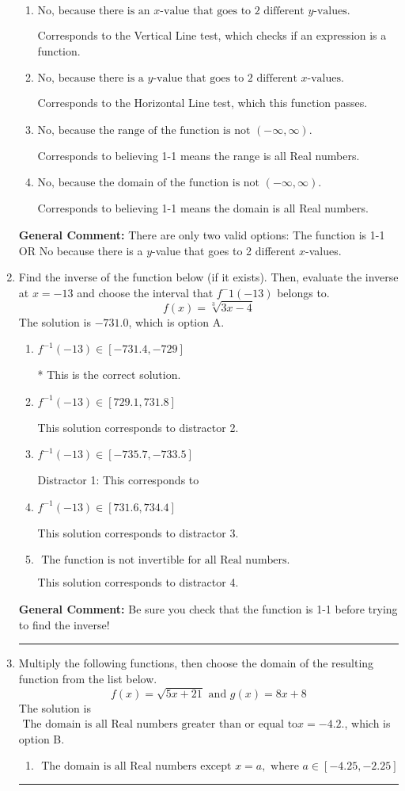 \documentclass{extbook}[14pt]
\newcommand{\litem}[1]{\item #1

\rule{\textwidth}{0.4pt}}
\begin{document}
\begin{enumerate}
{\begin{enumerate}[label=\Alph*.]
* This is the solution.
\item \( \text{No, because there is an $x$-value that goes to 2 different $y$-values.} \)

Corresponds to the Vertical Line test, which checks if an expression is a function.
\item \( \text{No, because there is a $y$-value that goes to 2 different $x$-values.} \)

Corresponds to the Horizontal Line test, which this function passes.
\item \( \text{No, because the range of the function is not $(-\infty, \infty)$.} \)

Corresponds to believing 1-1 means the range is all Real numbers.
\item \( \text{No, because the domain of the function is not $(-\infty, \infty)$.} \)

Corresponds to believing 1-1 means the domain is all Real numbers.
\end{enumerate}

\textbf{General Comment:} There are only two valid options: The function is 1-1 OR No because there is a $y$-value that goes to 2 different $x$-values.
}
\litem{
Find the inverse of the function below (if it exists). Then, evaluate the inverse at $x = -13$ and choose the interval that $f^-1(-13)$ belongs to.
\[ f(x) = \sqrt[3]{3 x - 4} \]The solution is \( -731.0 \), which is option A.\begin{enumerate}[label=\Alph*.]
\item \( f^{-1}(-13) \in [-731.4, -729] \)

* This is the correct solution.
\item \( f^{-1}(-13) \in [729.1, 731.8] \)

 This solution corresponds to distractor 2.
\item \( f^{-1}(-13) \in [-735.7, -733.5] \)

 Distractor 1: This corresponds to 
\item \( f^{-1}(-13) \in [731.6, 734.4] \)

 This solution corresponds to distractor 3.
\item \( \text{ The function is not invertible for all Real numbers. } \)

 This solution corresponds to distractor 4.
\end{enumerate}

\textbf{General Comment:} Be sure you check that the function is 1-1 before trying to find the inverse!
}
\litem{
Multiply the following functions, then choose the domain of the resulting function from the list below.
\[ f(x) = \sqrt{5x+21}  \text{ and } g(x) = 8x + 8 \]The solution is \( \text{ The domain is all Real numbers greater than or equal to} x = -4.2. \), which is option B.\begin{enumerate}[label=\Alph*.]
\item \( \text{ The domain is all Real numbers except } x = a, \text{ where } a \in [-4.25, -2.25] \)



\end{enumerate}}
\end{enumerate}
\end{document}
